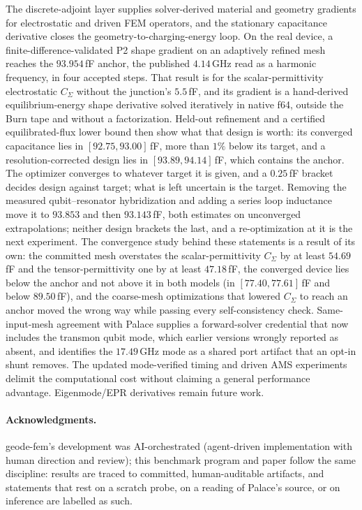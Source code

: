 \documentclass{anvil-paper}
\begin{document}
The discrete-adjoint layer supplies solver-derived material and
geometry gradients for electrostatic and driven FEM operators, and the
stationary capacitance derivative closes the geometry-to-charging-energy
loop. On the real device, a finite-difference-validated P2 shape
gradient on an adaptively refined mesh reaches the $93.954$\,fF anchor,
the published $4.14$\,GHz read as a harmonic frequency, in four accepted
steps. That result is for the scalar-permittivity electrostatic
$C_\Sigma$ without the junction's $5.5$\,fF, and its gradient is a
hand-derived equilibrium-energy shape derivative solved iteratively in
native f64, outside the Burn tape and without a factorization.
Held-out refinement and a certified equilibrated-flux lower bound then
show what that design is worth: its converged capacitance lies in
$[92.75, 93.00]$\,fF, more than $1\%$ below its target, and a
resolution-corrected design lies in $[93.89, 94.14]$\,fF, which contains
the anchor. The optimizer converges to whatever target it is given, and
a $0.25$\,fF bracket decides design against target; what is left
uncertain is the target. Removing the measured qubit--resonator
hybridization and adding a series loop inductance move it to $93.853$
and then $93.143$\,fF, both estimates on unconverged extrapolations;
neither design brackets the last, and a re-optimization at it is the
next experiment. The convergence study behind these statements is a
result of its own: the committed mesh overstates the scalar-permittivity
$C_\Sigma$ by at least $54.69$\,fF and the tensor-permittivity one by at
least $47.18$\,fF, the converged device lies below the anchor and not
above it in both models (in $[77.40, 77.61]$\,fF and below
$89.50$\,fF), and the coarse-mesh optimizations that lowered $C_\Sigma$
to reach an anchor moved the wrong way while passing every
self-consistency check. Same-input-mesh agreement with Palace supplies a
forward-solver credential that now includes the transmon qubit mode,
which earlier versions wrongly reported as absent, and identifies the
$17.49$\,GHz mode as a shared port artifact that an opt-in shunt removes.
The updated mode-verified timing and driven AMS experiments delimit the
computational cost without claiming a general performance advantage.
Eigenmode/EPR derivatives remain future work.

\paragraph{Acknowledgments.}
geode-fem's development was AI-orchestrated (agent-driven implementation
with human direction and review); this benchmark program and paper
follow the same discipline: results are traced to committed,
human-auditable artifacts, and statements that rest on a scratch probe,
on a reading of Palace's source, or on inference are labelled as such.
\end{document}
